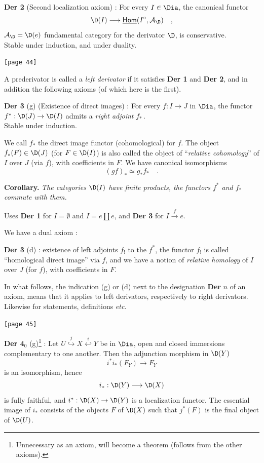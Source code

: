 
\noindent\textbf{Der 2} (Second localization axiom) : For every $I \in \Dia$, the canonical functor
\[ \D(I) \longrightarrow \underline{\mathsf{Hom}}(I^{\circ}, \mathcal{A}_{\D}) \quad , \]
$\mathcal{A}_{\D} = \D(e)$ fundamental category for the derivator $\D$, is conservative.\\
Stable under induction, and under duality.

\noindent{}\texttt{[page 44]}

\noindent A prederivator is called a \textit{left derivator} if it satisfies \textbf{Der 1} and \textbf{Der 2}, and in addition the following axioms (of which here is the first).

\noindent\textbf{Der 3} (g) (Existence of direct images) : For every $f : I \to J$ in $\Dia$, the functor $f^{*} : \D(J) \to \D(I)$ admits a \textit{right adjoint} $f_{*}$\,.\\
Stable under induction.

We call $f_{*}$ the direct image functor (cohomological) for $f$. The object $f_{*}(F) \in \D(J)$ (for $F \in \D(I)$) is also called the object of ``\textit{relative cohomology}'' of $I$ over $J$ (via $f$), with coefficients in $F$. We have canonical isomorphisms
\[ (gf)_{*} \simeq g_{*} f_{*} \quad . \]

\noindent\textbf{Corollary.} \textit{The categories $\D(I)$ have finite products, the functors $f^{*}$ and $f_{*}$ commute with them.}

Uses \textbf{Der 1} for $I = \emptyset$ and $I = e \amalg e$, and \textbf{Der 3} for $I \xrightarrow{f} e$.

We have a dual axiom :

\noindent\textbf{Der 3} (d) : existence of left adjoints $f_{!}$ to the $f^{*}$, the functor $f_{!}$ is called ``homological direct image'' via $f$, and we have a notion of \textit{relative homology} of $I$ over $J$ (for $f$), with coefficients in $F$.

In what follows, the indication (g) or (d) next to the designation \textbf{Der} $n$ of an axiom, %
means that it applies to left derivators, respectively to right derivators. Likewise for statements, definitions \textit{etc.}

\noindent{}\texttt{[page 45]}

\noindent\textbf{Der 4}$_{0}$ (g)\footnote[13]{Unnecessary as an axiom, will become a theorem (follows from the other axioms).} : Let $U \overset{j}{\hookrightarrow} X \overset{i}{\hookleftarrow} Y$ be in $\Dia$, open and closed immersions complementary to one another. Then the adjunction morphism in $\D(Y)$
\[ i^{*} i_{*}(F_{Y}) \longrightarrow F_{Y} \]
is an isomorphism, hence
\[ i_{*} : \D(Y) \longrightarrow \D(X) \]
is fully faithful, and $i^{*} : \D(X) \to \D(Y)$ is a localization functor. The essential image of $i_{*}$ consists of the objects $F$ of $\D(X)$ such that $j^{*}(F)$ is the final object of $\D(U)$.


